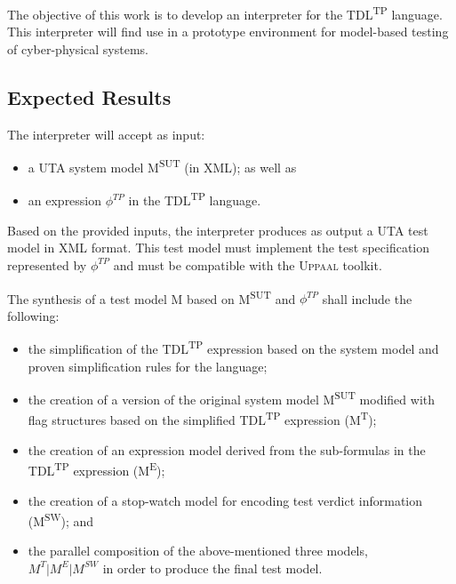 \documentclass[12pt,oneside,a4paper,draft,notitlepage]{article}
\begin{document}
	\bigskip

	\par The objective of this work is to develop an interpreter for the TDL\textsuperscript{TP} language. This interpreter will find use in a prototype environment for model-based testing of cyber-physical systems.

	\subsection*{Expected Results}
	\par The interpreter will accept as input:
	\begin{itemize}
		\item a UTA system model M\textsuperscript{SUT} (in XML); as well as
		\item an expression $\phi^{TP}$ in the TDL\textsuperscript{TP} language.
	\end{itemize}

	\par Based on the provided inputs, the interpreter produces as output a UTA test model in XML format. This test model must implement the test specification represented by $\phi^{TP}$ and must be compatible with the \textsc{Uppaal} toolkit.

	\bigskip

	\par The synthesis of a test model M based on M\textsuperscript{SUT} and $\phi^{TP}$ shall include the following:
	\begin{itemize}
		\item the simplification of the TDL\textsuperscript{TP} expression based on the system model and proven simplification rules for the language;
		\item the creation of a version of the original system model M\textsuperscript{SUT} modified with flag structures based on the simplified TDL\textsuperscript{TP} expression (M\textsuperscript{T});
		\item the creation of an expression model derived from the sub-formulas in the TDL\textsuperscript{TP} expression (M\textsuperscript{E});
		\item the creation of a stop-watch model for encoding test verdict information (M\textsuperscript{SW}); and
		\item the parallel composition of the above-mentioned three models, \\
		$M^{T} \vert M^{E} \vert M^{SW}$ in order to produce the final test model.
	\end{itemize}
\end{document}
